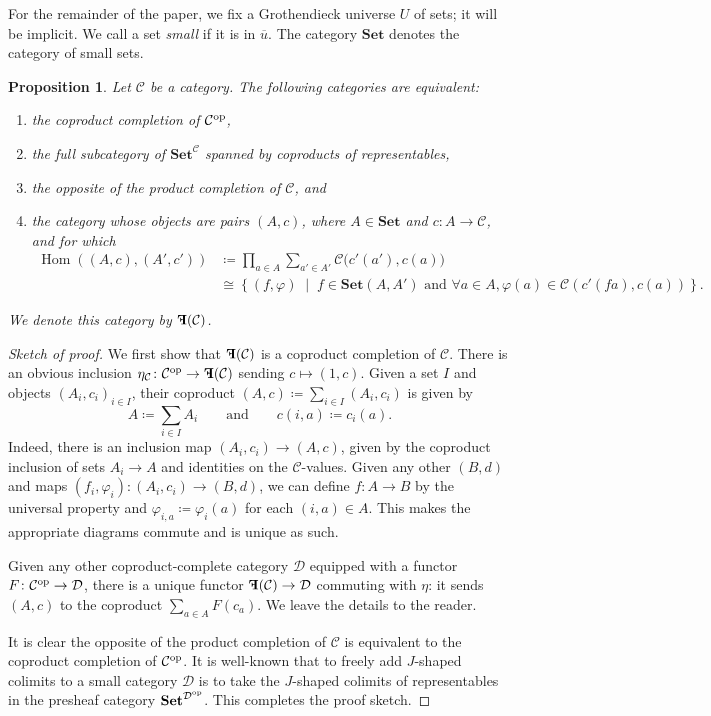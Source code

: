 \documentclass[11pt, one side, article]{memoir}
\theoremstyle{definition}
\theoremstyle{plain}
\newtheorem{proposition}[definitionx]{Proposition}
\DeclareMathOperator{\Hom}{Hom}
\newcommand{\cat}[1]{\mathcal{#1}}%
\newcommand{\Cat}[1]{\mathbf{#1}}%
\newcommand{\op}{^\tn{op}}
\newcommand{\tn}[1]{\textnormal{#1}}
\newcommand{\ol}[1]{\overline{#1}}
\newcommand{\smset}{\Cat{Set}}
\newcommand{\0}{\Cat{0}}
\newcommand{\1}{\Cat{1}}
\newcommand{\mn}{\reflectbox{$\Cat{F}$}}
\newcommand{\qqand}{\qquad\text{and}\qquad}
\begin{document}
For the remainder of the paper, we fix a Grothendieck universe $U$ of sets; it will be implicit. We call a set \emph{small} if it is in $\ol{u}$. The category $\smset$ denotes the category of small sets.

\begin{proposition}
Let $\cat{C}$ be a category. The following categories are equivalent:
\begin{enumerate}
	\item the coproduct completion of $\cat{C}\op$,
	\item the full subcategory of $\smset^\cat{C}$ spanned by coproducts of representables,
	\item the opposite of the product completion of $\cat{C}$, and
	\item the category whose objects are pairs $(A,c)$, where $A\in\smset$ and $c\colon A\to\cat{C}$, and for which
	\begin{align*}
	\Hom((A,c),(A',c'))&\coloneqq\prod_{a\in A}\sum_{a'\in A'}\cat{C}\big(c'(a'),c(a)\big)\\&\cong\left\{(f,\varphi)\;\middle|\; f\in\smset(A,A')\text{ and }\forall a\in A, \varphi(a)\in\cat{C}(c'(fa),c(a))\right\}.
	\end{align*}
\end{enumerate}
We denote this category by $\mn(\cat{C})$.
\end{proposition}
\begin{proof}[Sketch of proof]
We first show that $\mn(\cat{C})$ is a coproduct completion of $\cat{C}$. There is an obvious inclusion $\eta_\cat{C}\colon \cat{C}\op\to\mn(\cat{C})$ sending $c\mapsto (1,c)$. Given a set $I$ and objects $(A_i,c_i)_{i\in I}$, their coproduct $(A,c)\coloneqq\sum_{i\in I}(A_i,c_i)$ is given by
\[
A\coloneqq\sum_{i\in I}A_i
\qqand
c(i,a)\coloneqq c_i(a).
\]
Indeed, there is an inclusion map $(A_i,c_i)\to (A,c)$, given by the coproduct inclusion of sets $A_i\to A$ and identities on the $\cat{C}$-values. Given any other $(B,d)$ and maps $(f_i,\varphi_i)\colon (A_i,c_i)\to(B,d)$, we can define $f\colon A\to B$ by the universal property and $\varphi_{i,a}\coloneqq\varphi_i(a)$ for each $(i,a)\in A$. This makes the appropriate diagrams commute and is unique as such.

Given any other coproduct-complete category $\cat{D}$ equipped with a functor $F\colon\cat{C}\op\to\cat{D}$, there is a unique functor $\mn(\cat{C})\to\cat{D}$ commuting with $\eta$: it sends $(A,c)$ to the coproduct $\sum_{a\in A}F(c_a)$. We leave the details to the reader.

It is clear the opposite of the product completion of $\cat{C}$ is equivalent to the coproduct completion of $\cat{C}\op$. It is well-known that to freely add $J$-shaped colimits to a small category $\cat{D}$ is to take the $J$-shaped colimits of representables in the presheaf category $\smset^{\cat{D}\op}$. This completes the proof sketch.
\end{proof}
\end{document}

